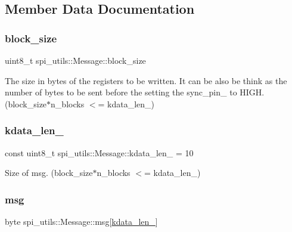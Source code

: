 \subsection{Member Data Documentation}
\mbox{\label{structspi__utils_1_1Message_a778bc7823110409e3009c773816521be}} 
\subsubsection{\texorpdfstring{block\+\_\+size}{block\_size}}
{\footnotesize\ttfamily uint8\+\_\+t spi\+\_\+utils\+::\+Message\+::block\+\_\+size}

The size in bytes of the registers to be written. It can be also be think as the number of bytes to be sent before the setting the sync\+\_\+pin\+\_\+ to H\+I\+GH. (block\+\_\+size$\ast$n\+\_\+blocks $<$= kdata\+\_\+len\+\_\+) \mbox{\label{structspi__utils_1_1Message_a47848d542d0954679bad7a40dc5b0064}} 
\subsubsection{\texorpdfstring{kdata\+\_\+len\+\_\+}{kdata\_len\_}}
{\footnotesize\ttfamily const uint8\+\_\+t spi\+\_\+utils\+::\+Message\+::kdata\+\_\+len\+\_\+ = 10\hspace{0.3cm}{\ttfamily [static]}}

Size of msg. (block\+\_\+size$\ast$n\+\_\+blocks $<$= kdata\+\_\+len\+\_\+) \mbox{\label{structspi__utils_1_1Message_aef999e9fd6fe0d4ab21aa2a6bf740f55}} 
\subsubsection{\texorpdfstring{msg}{msg}}
{\footnotesize\ttfamily byte spi\+\_\+utils\+::\+Message\+::msg\mbox{[}\mbox{\hyperlink{structspi__utils_1_1Message_a47848d542d0954679bad7a40dc5b0064}{kdata\+\_\+len\+\_\+}}\mbox{]}}

